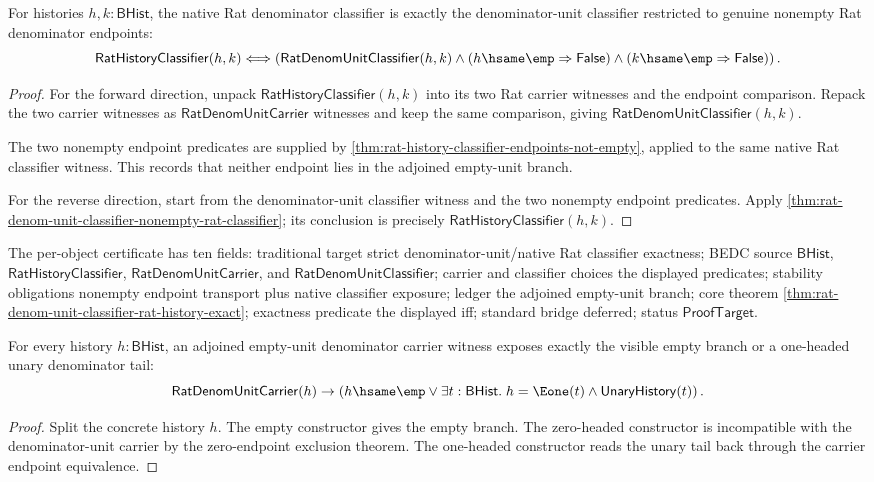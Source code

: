 \begin{theorem}
\label{thm:rat-denom-unit-classifier-rat-history-exact}
For histories $h,k:\mathsf{BHist}$, the native Rat denominator classifier is
exactly the denominator-unit classifier restricted to genuine nonempty Rat
denominator endpoints:
$$
\mathsf{RatHistoryClassifier}(h,k)
\Longleftrightarrow
\left(
\mathsf{RatDenomUnitClassifier}(h,k)\land
(h\hsame\emp\Rightarrow\mathsf{False})\land
(k\hsame\emp\Rightarrow\mathsf{False})
\right).
$$
\end{theorem}
\begin{proof}
For the forward direction, unpack
$\mathsf{RatHistoryClassifier}(h,k)$ into its two Rat carrier witnesses and
the endpoint comparison. Repack the two carrier witnesses as
$\mathsf{RatDenomUnitCarrier}$ witnesses and keep the same comparison, giving
$\mathsf{RatDenomUnitClassifier}(h,k)$.

The two nonempty endpoint predicates are supplied by
\autoref{thm:rat-history-classifier-endpoints-not-empty}, applied to the
same native Rat classifier witness. This records that neither endpoint lies in
the adjoined empty-unit branch.

For the reverse direction, start from the denominator-unit classifier witness
and the two nonempty endpoint predicates. Apply
\autoref{thm:rat-denom-unit-classifier-nonempty-rat-classifier}; its conclusion
is precisely $\mathsf{RatHistoryClassifier}(h,k)$.
\end{proof}

The per-object certificate has ten fields: traditional target strict
denominator-unit/native Rat classifier exactness; BEDC source
$\mathsf{BHist}$, $\mathsf{RatHistoryClassifier}$,
$\mathsf{RatDenomUnitCarrier}$, and $\mathsf{RatDenomUnitClassifier}$;
carrier and classifier choices the displayed predicates; stability obligations
nonempty endpoint transport plus native classifier exposure; ledger the
adjoined empty-unit branch; core theorem
\ref{thm:rat-denom-unit-classifier-rat-history-exact}; exactness predicate the
displayed iff; standard bridge deferred; status $\mathsf{ProofTarget}$.

\begin{theorem}
\label{thm:rat-denom-unit-carrier-visible-cases}
For every history $h:\mathsf{BHist}$, an adjoined empty-unit denominator carrier
witness exposes exactly the visible empty branch or a one-headed unary
denominator tail:
$$
\mathsf{RatDenomUnitCarrier}(h)\to
\left(
h\hsame\emp
\lor
\exists t:\mathsf{BHist}.\; h=\Eone(t)\land \mathsf{UnaryHistory}(t)
\right).
$$
\end{theorem}
\begin{proof}
Split the concrete history $h$. The empty constructor gives the empty branch.
The zero-headed constructor is incompatible with the denominator-unit carrier
by the zero-endpoint exclusion theorem. The one-headed constructor reads the
unary tail back through the carrier endpoint equivalence.
\end{proof}

